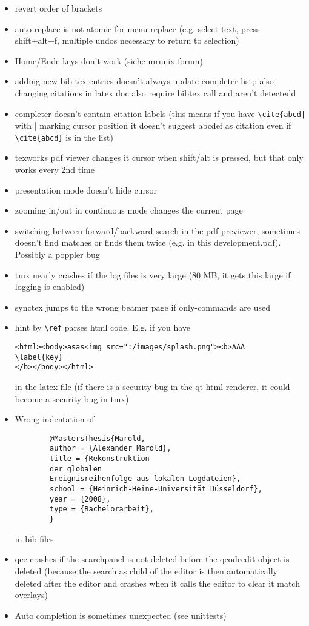 \documentclass[10pt,a4paper,landscape]{report}
\begin{document}
\begin{itemize}
\item revert order of brackets
\item auto replace is not atomic for menu replace (e.g. select text, press shift+alt+f, multiple undos necessary to return to selection)
\item Home/Ende keys don't work (siehe mrunix forum)
\item adding new bib tex entries doesn't always update completer list;; also changing citations in latex doc also require bibtex call and aren't detectedd
\item completer doesn't contain citation labels (this means if you have \verb+\cite{abcd|+ with | marking cursor position it doesn't suggest abcdef as citation even if \verb+\cite{abcd}+ is in the list)
\item texworks pdf viewer changes it cursor when shift/alt is pressed, but that only works every 2nd time
\item presentation mode doesn't hide cursor
\item zooming in/out in continuous mode changes the current page
\item switching between forward/backward search in the pdf previewer, sometimes doesn't find matches or finds them twice (e.g. in this development.pdf). Possibly a poppler bug
\item tmx nearly crashes if the log files is very large (80 MB, it gets this large if logging is enabled)
\item synctex jumps to the wrong beamer page if only-commands are used
\item hint by \verb+\ref+ parses html code. E.g. if you have \begin{verbatim}
<html><body>asas<img src=":/images/splash.png"><b>AAA
\label{key}
</b></body></html>
\end{verbatim} in the latex file (if there is a security bug in the qt html renderer, it could become a security bug in tmx)
	\item Wrong indentation of \begin{verbatim}
		@MastersThesis{Marold,
		author = {Alexander Marold},
		title = {Rekonstruktion 
		der globalen 
		Ereignisreihenfolge aus lokalen Logdateien},
		school = {Heinrich-Heine-Universität Düsseldorf},
		year = {2008},
		type = {Bachelorarbeit},
		}
	\end{verbatim} in bib files
	\item  qce crashes if the searchpanel is not deleted before the qcodeedit object is deleted (because the search as child of the editor is then automatically deleted after the editor and crashes when it calls the editor to clear it match overlays)
	\item  Auto completion is sometimes unexpected (see unittests)
\end{itemize} 
\end{document}

